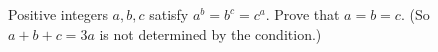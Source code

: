 Positive integers $a,b,c$ satisfy $a^b=b^c=c^a$. Prove that $a=b=c$. (So $a+b+c=3a$ is not determined by the condition.)
